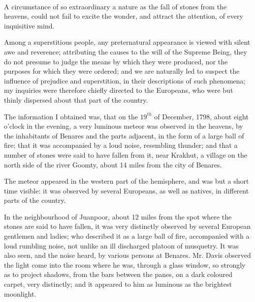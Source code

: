 \documentclass[a4paper, 12pt, oneside, twocolumn]{article}
\begin{document}
\paragraph{}
A circumstance of so extraordinary a nature as the fall of stones from the heavens, could not fail to excite the wonder, and attract the attention, of every inquisitive mind.

Among a superstitious people, any preternatural appearance is viewed with silent awe and reverence; attributing the causes to the will of the Supreme Being, they do not presume to judge the means by which they were produced, nor the purposes for which they were ordered; and we are naturally led to suspect the influence of prejudice and superstition, in their descriptions of such phenomena; my inquiries were therefore chiefly directed to the Europeans, who were but thinly dispersed about that part of the country.

The information I obtained was, that on the $19^{th}$ of December, 1798, about eight o'clock in the evening, a very luminous meteor was observed in the heavens, by the inhabitants of Benares and the parts adjacent, in the form of a large ball of fire; that it was accompanied by a loud noise, resembling thunder; and that a number of stones were said to have fallen from it, near Krakhut, a village on the north side of the river Goomty, about 14 miles from the city of Benares.

The meteor appeared in the western part of the hemisphere, and was but a short time visible: it was observed by several Europeans, as well as natives, in different parts of the country.

In the neighbourhood of Juanpoor, about 12 miles from the spot where the stones are said to have fallen, it was very distinctly observed by several European gentlemen and ladies; who described it as a large ball of fire, accompanied with a loud rumbling noise, not unlike an ill discharged platoon of musquetry. It was also seen, and the noise heard, by various persons at Benares. Mr. Davis observed the light come into the room where he was, through a glass window, so strongly as to project shadows, from the bars between the panes, on a dark coloured carpet, very distinctly; and it appeared to him as luminous as the brightest moonlight.
\end{document}
